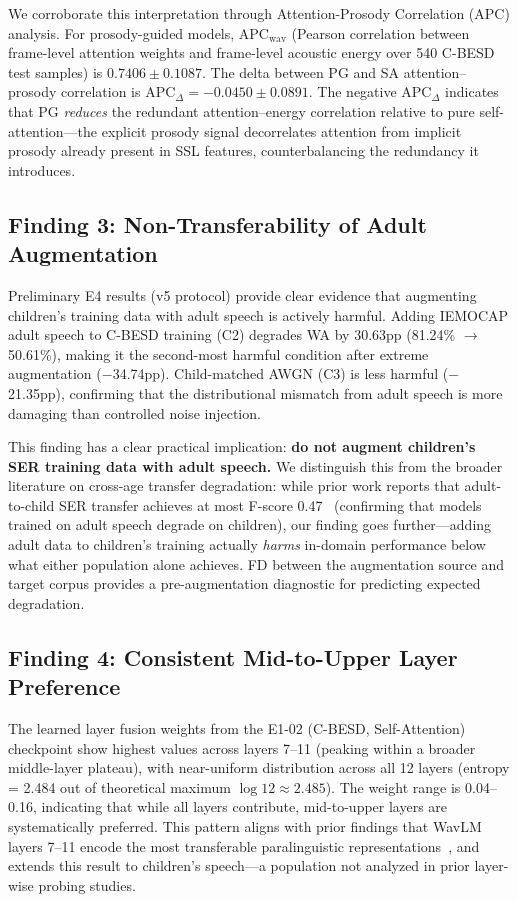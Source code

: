 \documentclass[11pt,a4paper]{article}
\begin{document}
We corroborate this interpretation through Attention-Prosody Correlation (APC)
analysis. For prosody-guided models, APC$_{\text{wav}}$ (Pearson correlation
between frame-level attention weights and frame-level acoustic energy over
540 C-BESD test samples) is $0.7406 \pm 0.1087$. The delta between PG and SA
attention--prosody correlation is APC$_{\Delta} = -0.0450 \pm 0.0891$. The
negative APC$_{\Delta}$ indicates that PG \textit{reduces} the redundant
attention--energy correlation relative to pure self-attention---the explicit
prosody signal decorrelates attention from implicit prosody already present in
SSL features, counterbalancing the redundancy it introduces.

\subsection{Finding 3: Non-Transferability of Adult Augmentation}

Preliminary E4 results (v5 protocol) provide clear evidence that augmenting
children's training data with adult speech is actively harmful. Adding IEMOCAP
adult speech to C-BESD training (C2) degrades WA by 30.63pp (81.24\%
$\rightarrow$ 50.61\%), making it the second-most harmful condition after
extreme augmentation ($-$34.74pp). Child-matched AWGN (C3) is less harmful
($-$21.35pp), confirming that the distributional mismatch from adult speech is
more damaging than controlled noise injection.

This finding has a clear practical implication: \textbf{do not augment
children's SER training data with adult speech.} We distinguish this from the
broader literature on cross-age transfer degradation: while prior work reports
that adult-to-child SER transfer achieves at most F-score
0.47~\cite{lesyk2024adult} (confirming that models trained on adult speech
degrade on children), our finding goes further---adding adult data to
children's training actually \textit{harms} in-domain performance below what
either population alone achieves. FD between the augmentation source and target
corpus provides a pre-augmentation diagnostic for predicting expected
degradation.

\subsection{Finding 4: Consistent Mid-to-Upper Layer Preference}

The learned layer fusion weights from the E1-02 (C-BESD, Self-Attention)
checkpoint show highest values across layers 7--11 (peaking within a broader
middle-layer plateau), with near-uniform
distribution across all 12 layers (entropy = 2.484 out of theoretical maximum
$\log 12 \approx 2.485$). The weight range is 0.04--0.16, indicating that
while all layers contribute, mid-to-upper layers are systematically preferred.
This pattern aligns with prior findings that WavLM layers 7--11 encode the most
transferable paralinguistic representations~\cite{pasad2021layer,
upadhyay2024wavlm,chiu2025probing}, and extends
this result to children's speech---a population not analyzed in prior
layer-wise probing studies.
\end{document}

